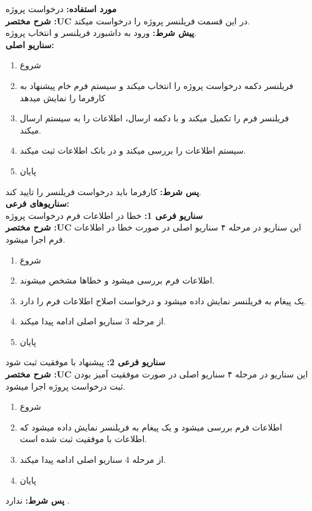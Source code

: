 \documentclass[20pt,a5paper]{report}
\begin{document}
\noindent \textbf{مورد استفاده:}
درخواست پروژه
\\
\textbf{شرح مختصر :UC}
در این قسمت فریلنسر پروژه را درخواست میکند.
\\
\textbf{پيش شرط:}
ورود به داشبورد فریلنسر و انتخاب پروژه.
\\
\textbf{سناريو اصلی:}
\begin{enumerate}
\item
شروع
\item
فریلنسر دکمه درخواست پروژه را انتخاب میکند و سیستم فرم خام پیشنهاد به کارفرما را نمایش میدهد
\item
فریلنسر فرم را تکمیل میکند و با دکمه ارسال، اطلاعات را به سیستم ارسال میکند.
\item
سیستم اطلاعات را بررسی میکند و در بانک اطلاعات ثبت میکند.
\item
پایان
\end{enumerate}
\textbf{پس شرط:}
کارفرما باید درخواست فریلنسر را تایید کند.
\\
\textbf{سناريوهای فرعی:}
\ \\
\textbf{سناريو فرعی 1:}
خطا در اطلاعات فرم درخواست پروژه
\\
\textbf{شرح مختصر :UC}
این سناریو در مرحله ۴ سناریو اصلی در صورت خطا در اطلاعات فرم اجرا میشود.
\begin{enumerate}
\item
شروع
\item
اطلاعات فرم بررسی میشود و خطاها مشخص میشوند.
\item
یک پیغام به فریلنسر نمایش داده میشود و درخواست اصلاح اطلاعات فرم را دارد.
\item
از مرحله 3 سناریو اصلی ادامه پیدا میکند.
\item
پایان
\end{enumerate}
\textbf{سناريو فرعی 2:}
پیشنهاد با موفقیت ثبت شود
\\
\textbf{شرح مختصر :UC}
این سناریو در مرحله ۴ سناریو اصلی در صورت موفقیت آمیز بودن ثبت درخواست پروژه اجرا میشود.
\begin{enumerate}
\item
شروع
\item
اطلاعات فرم بررسی میشود و یک پیغام به فریلنسر نمایش داده میشود که اطلاعات با موفقیت ثبت شده است.
\item
از مرحله 4 سناریو اصلی ادامه پیدا میکند.
\item
پایان
\end{enumerate}

\textbf{پس شرط:}
ندارد .


\centering
\vfill
\lr{\LaTeX}
\end{document}
